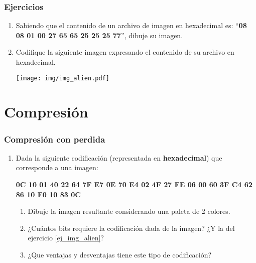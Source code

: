 \documentclass[12pt]{article}
\begin{document}
\subsubsection*{Ejercicios}

\begin{enumerate}[resume]

    \item Sabiendo que el contenido de un archivo de imagen en hexadecimal es:
        ``\textbf{08 08 01 00 27 65 65 25 25 25 77}'', dibuje su imagen.

    \item Codifique la siguiente imagen expresando el contenido de su archivo
        en hexadecimal. \label{ej_img_alien}

        \texttt{[image: img/img\_alien.pdf]}

\end{enumerate}

\section*{Compresión}
\label{sec_compresion}

\subsubsection*{Compresión con perdida}

\begin{enumerate}[resume]

    \item Dada la siguiente codificación (representada en
        \textbf{hexadecimal}) que corresponde a una imagen:

        \textbf{0C 10 01 40 22 64 7F E7 0E 70 E4 02 4F 27 FE 06 00 60 3F C4 62
        86 10 F0 10 83 0C} \label{ej_img_alien_perdida}

        \begin{enumerate}

            \item Dibuje la imagen resultante considerando una paleta de 2 colores.

            \item ¿Cuántos bits requiere la codificación dada de la imagen? ¿Y
                la del ejercicio \ref{ej_img_alien}?

            \item ¿Que ventajas y desventajas tiene este tipo de codificación?

        \end{enumerate}

\end{enumerate}
\end{document}
